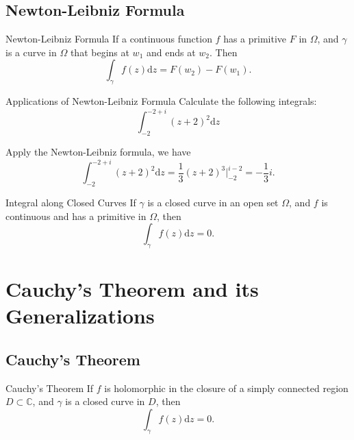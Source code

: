 \subsection{Newton-Leibniz Formula}

\begin{theorem}{Newton-Leibniz Formula}{}
  If a continuous function $f$ has a primitive $F$ in $\Omega$,
  and $\gamma$ is a curve in $\Omega$ that begins at $w_1$ and
  ends at $w_2$. Then
  \begin{equation}
    \int_{\gamma}f(z)\mathrm{d} z = F(w_2) - F(w_1).
  \end{equation}
\end{theorem}

\begin{example}{Applications of Newton-Leibniz Formula}{}
  Calculate the following integrals:
  \begin{equation}
    \int_{-2}^{-2 + i} (z+2)^2 \mathrm{d} z
  \end{equation}
\end{example}

\begin{solution}
  Apply the Newton-Leibniz formula, we have
  \begin{equation}
    \int_{-2}^{-2+i} (z+2)^2 \mathrm{d} z = \frac{1}{3}(z+2)^3 \big|^{i-2}_{-2}
    = - \frac{1}{3}i.
  \end{equation}
\end{solution}

\begin{corollary}{Integral along Closed Curves}{}
  If $\gamma$ is a closed curve in an open set $\Omega$,
  and $f$ is continuous and has a primitive in $\Omega$, then
  \begin{equation}
    \int_{\gamma} f(z) \mathrm{d} z = 0.
  \end{equation}
\end{corollary}

\section{Cauchy's Theorem and its Generalizations}

\subsection{Cauchy's Theorem}

\begin{theorem}{Cauchy's Theorem}{}
  If $f$ is holomorphic in the closure of a simply connected region $D \subset \mathbb{C}$,
  and $\gamma$ is a closed curve in $D$, then
  \begin{equation}
    \int_{\gamma} f(z)\mathrm{d} z = 0.
  \end{equation}
\end{theorem}

